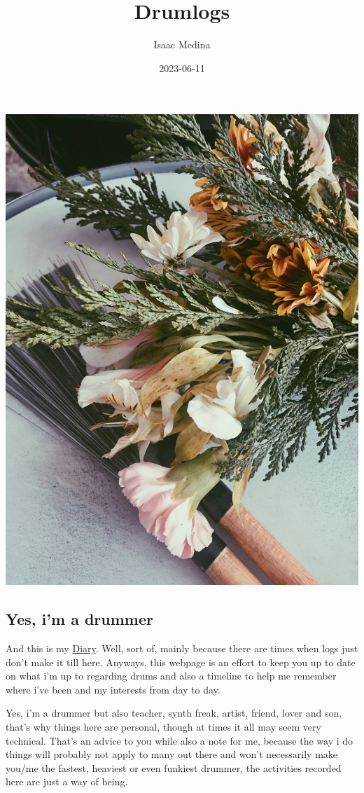 \documentclass[
]{book}
\title{Drumlogs}
\author{Isaac Medina}
\date{2023-06-11}
\begin{document}
\maketitle

{
\setcounter{tocdepth}{1}
\tableofcontents
}
\hypertarget{section}{%
\chapter*{}\label{section}}

\begin{center}\includegraphics[width=0.6\linewidth]{images/flowerBrush1} \end{center}

\hypertarget{yes-im-a-drummer}{%
\section*{Yes, i'm a drummer}\label{yes-im-a-drummer}}

And this is my \protect\hyperlink{Diary}{Diary}. Well, sort of, mainly because there are times when logs just don't make it till here. Anyways, this webpage is an effort to keep you up to date on what i'm up to regarding drums and also a timeline to help me remember where i've been and my interests from day to day.

Yes, i'm a drummer but also teacher, synth freak, artist, friend, lover and son, that's why things here are personal, though at times it all may seem very technical. That's an advice to you while also a note for me, because the way i do things will probably not apply to many out there and won't necessarily make you/me the fastest, heaviest or even funkiest drummer, the activities recorded here are just a way of being.
\end{document}
